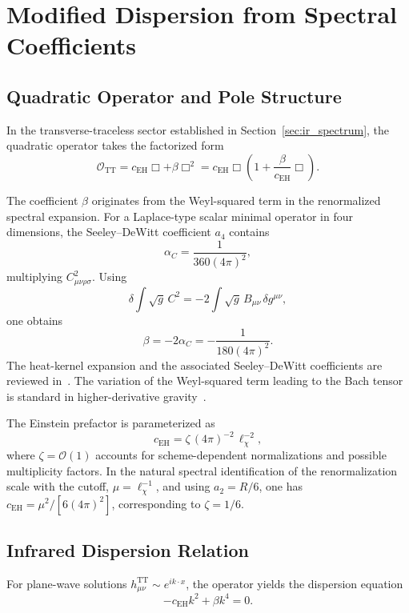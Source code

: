 \section{Modified Dispersion from Spectral Coefficients}
  \label{sec:dispersion}

  \subsection{Quadratic Operator and Pole Structure}
    \label{subsec:quadratic-operator-and-pole-structure}

    In the transverse-traceless sector established in Section~\ref{sec:ir_spectrum},
    the quadratic operator takes the factorized form
    \[
      \mathcal{O}_{\mathrm{TT}} = c_{\mathrm{EH}}\Box + \beta \Box^2 = c_{\mathrm{EH}}
      \Box
      \left( 1 + \frac{\beta}{c_{\mathrm{EH}}}\Box \right).
    \]

    The coefficient $\beta$ originates from the Weyl-squared term in the renormalized spectral expansion.
    For a Laplace-type scalar minimal operator in four dimensions, the Seeley--DeWitt coefficient $a_4$ contains
    \[
      \alpha_C = \frac{1}{360(4\pi)^2},
    \]
    multiplying $C_{\mu\nu\rho\sigma}^2$.
    Using
    \[
      \delta \int \sqrt g\, C^2 = -2 \int \sqrt g\, B_{\mu\nu}\,\delta g^{\mu\nu},
    \]
    one obtains
    \[
      \beta = -2\alpha_C = -\frac{1}{180(4\pi)^2}.
    \]
    The heat-kernel expansion and the associated Seeley--DeWitt
    coefficients are reviewed in~\cite{Vassilevich2003,DeWitt1965}.
    The variation of the Weyl-squared term leading to the Bach tensor is
    standard in higher-derivative gravity~\cite{Bach1921,Stelle1977}.

    The Einstein prefactor is parameterized as
    \[
      c_{\mathrm{EH}} = \zeta\,(4\pi)^{-2}\,\ell_\chi^{-2},
    \]
    where $\zeta=\mathcal{O}(1)$ accounts for scheme-dependent
    normalizations and possible multiplicity factors.
    In the natural spectral identification of the renormalization scale
    with the cutoff, $\mu=\ell_\chi^{-1}$, and using $a_2=R/6$, one has $c_{\mathrm{EH}}=\mu^2/[6(4\pi)^2]$,
    corresponding to $\zeta=1/6$.

  \subsection{Infrared Dispersion Relation}
    \label{subsec:infrared-dispersion-relation}

    For plane-wave solutions $h^{\mathrm{TT}}_{\mu\nu} \sim e^{ik\cdot x}$, the operator yields the dispersion equation
    \[
      -c_{\mathrm{EH}} k^2 + \beta k^4 = 0.
    \]


